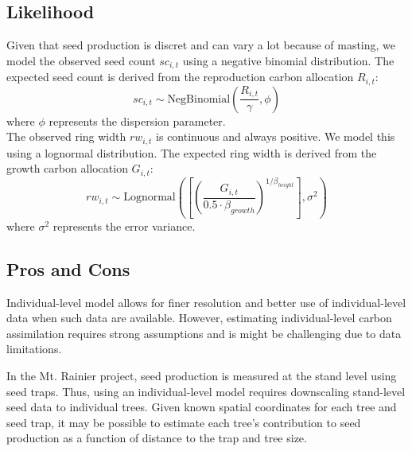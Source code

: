 \documentclass[11pt]{article}
\begin{document}
\subsection{Likelihood}
Given that seed production is discret and can vary a lot because of masting, we model the observed seed count $sc_{i,t}$ using a negative binomial distribution. The expected seed count is derived from the reproduction carbon allocation $R_{i,t}$:
\begin{equation}
    sc_{i,t} \sim \text{NegBinomial} \left( \frac{R_{i,t}}{\gamma}, \phi \right)
\end{equation}
where $\phi$ represents the dispersion parameter.\\

The observed ring width $rw_{i,t}$ is continuous and always positive. We model this using a lognormal distribution. The expected ring width is derived from the growth carbon allocation $G_{i,t}$:
\begin{equation}
    rw_{i,t} \sim \text{Lognormal} \left( \left[ \left( \frac{G_{i,t}}{0.5 \cdot \beta_{growth}} \right)^{1/\beta_{height}} \right], \sigma^2 \right)
\end{equation}
where $\sigma^2$ represents the error variance.

\subsection{Pros and Cons}

Individual-level model allows for finer resolution and better use of individual-level data when such data are available. However, estimating individual-level carbon assimilation requires strong assumptions and is might be challenging due to data limitations.

In the Mt. Rainier project, seed production is measured at the stand level using seed traps. Thus, using an individual-level model requires downscaling stand-level seed data to individual trees. Given known spatial coordinates for each tree and seed trap, it may be possible to estimate each tree’s contribution to seed production as a function of distance to the trap and tree size.
\end{document}
